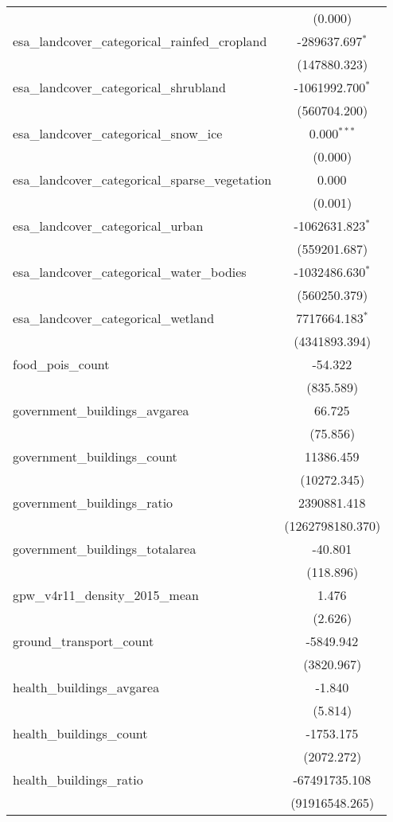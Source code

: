 \begin{table}[!htbp]
\begin{tabular}{@{\extracolsep{5pt}}lc}
  & (0.000) \\
 esa_landcover_categorical_rainfed_cropland & -289637.697$^{*}$ \\
  & (147880.323) \\
 esa_landcover_categorical_shrubland & -1061992.700$^{*}$ \\
  & (560704.200) \\
 esa_landcover_categorical_snow_ice & 0.000$^{***}$ \\
  & (0.000) \\
 esa_landcover_categorical_sparse_vegetation & 0.000$^{}$ \\
  & (0.001) \\
 esa_landcover_categorical_urban & -1062631.823$^{*}$ \\
  & (559201.687) \\
 esa_landcover_categorical_water_bodies & -1032486.630$^{*}$ \\
  & (560250.379) \\
 esa_landcover_categorical_wetland & 7717664.183$^{*}$ \\
  & (4341893.394) \\
 food_pois_count & -54.322$^{}$ \\
  & (835.589) \\
 government_buildings_avgarea & 66.725$^{}$ \\
  & (75.856) \\
 government_buildings_count & 11386.459$^{}$ \\
  & (10272.345) \\
 government_buildings_ratio & 2390881.418$^{}$ \\
  & (1262798180.370) \\
 government_buildings_totalarea & -40.801$^{}$ \\
  & (118.896) \\
 gpw_v4r11_density_2015_mean & 1.476$^{}$ \\
  & (2.626) \\
 ground_transport_count & -5849.942$^{}$ \\
  & (3820.967) \\
 health_buildings_avgarea & -1.840$^{}$ \\
  & (5.814) \\
 health_buildings_count & -1753.175$^{}$ \\
  & (2072.272) \\
 health_buildings_ratio & -67491735.108$^{}$ \\
  & (91916548.265) \\

\end{tabular}
\end{table}
